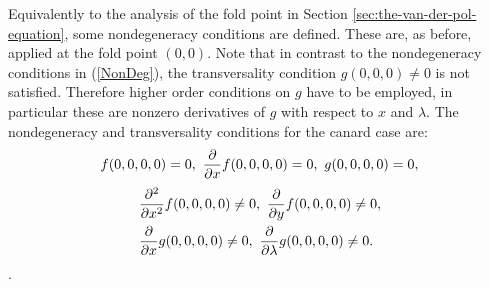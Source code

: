 Equivalently to the analysis of the fold point in Section \ref{sec:the-van-der-pol-equation}, some nondegeneracy conditions are defined.
These are, as before, applied at the fold point $(0,0)$. Note that in contrast to the nondegeneracy conditions in (\ref{NonDeg}), the transversality condition $g(0,0,0) \neq 0$ is not satisfied. Therefore higher order conditions on $g$ have to be employed, in particular these are nonzero derivatives of $g$ with respect to $x$ and $\lambda$.
The nondegeneracy and transversality conditions for the canard case are:
\begin{equation}
f(0,0,0,0)=0, \ \pd{}{x}f(0,0,0,0)=0, \ g(0,0,0,0)=0, \label{eq: canard sing condition}
\end{equation}
\begin{equation}
\begin{aligned}
&\pd{^2}{x^2}f(0,0,0,0)\neq 0, \ \pd{}{y}f(0,0,0,0)\neq 0,\\
&\pd{}{x}g(0,0,0,0)\neq 0, \ \pd{}{\lambda}g(0,0,0,0)\neq 0. \label{eq: canard non-d condition}
\end{aligned}
\end{equation}
 \citep{krupa2001}. 


